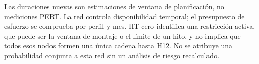 Las duraciones nuevas son estimaciones de ventana de planificación, no mediciones PERT. La red controla disponibilidad temporal; el presupuesto de esfuerzo se comprueba por perfil y mes. HT cero identifica una restricción activa, que puede ser la ventana de montaje o el límite de un hito, y no implica que todos esos nodos formen una única cadena hasta H12. No se atribuye una probabilidad conjunta a esta red sin un análisis de riesgo recalculado.

